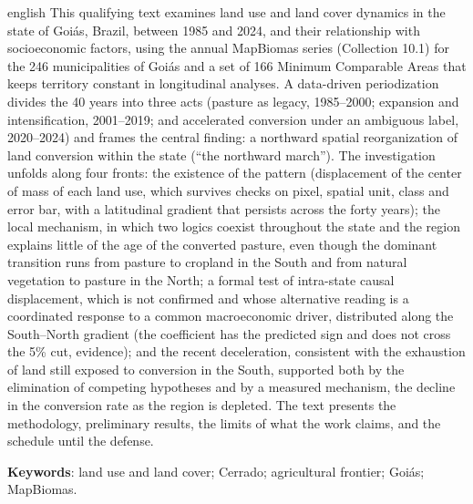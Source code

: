 \begin{resumo}[Abstract]
\begin{otherlanguage*}{english}
This qualifying text examines land use and land cover dynamics in the state of
Goiás, Brazil, between 1985 and 2024, and their relationship with socioeconomic
factors, using the annual MapBiomas series (Collection 10.1) for the 246
municipalities of Goiás and a set of 166 Minimum Comparable Areas that keeps
territory constant in longitudinal analyses. A data-driven periodization
divides the 40 years into three acts (pasture as legacy, 1985--2000; expansion
and intensification, 2001--2019; and accelerated conversion under an ambiguous
label, 2020--2024) and frames the central finding: a northward spatial
reorganization of land conversion within the state (``the northward march'').
The investigation unfolds along four fronts: the existence of the pattern
(displacement of the center of mass of each land use, which survives checks on
pixel, spatial unit, class and error bar, with a latitudinal gradient that
persists across the forty years); the local mechanism, in which two logics
coexist throughout the state and the region explains little of the age of the
converted pasture, even though the dominant transition runs from pasture to
cropland in the South and from natural vegetation to pasture in the North; a
formal test of intra-state causal displacement, which is not confirmed and whose
alternative reading is a coordinated response to a common macroeconomic driver,
distributed along the South--North gradient (the coefficient has the predicted
sign and does not cross the 5\% cut,
evidence); and the recent deceleration, consistent with the exhaustion of land
still exposed to conversion in the South, supported both by the elimination of
competing hypotheses and by a measured mechanism, the decline in the conversion
rate as the region is depleted. The text presents the methodology, preliminary
results, the limits of what the work claims, and the schedule until the
defense.

\textbf{Keywords}: land use and land cover; Cerrado; agricultural frontier;
Goiás; MapBiomas.
\end{otherlanguage*}
\end{resumo}
